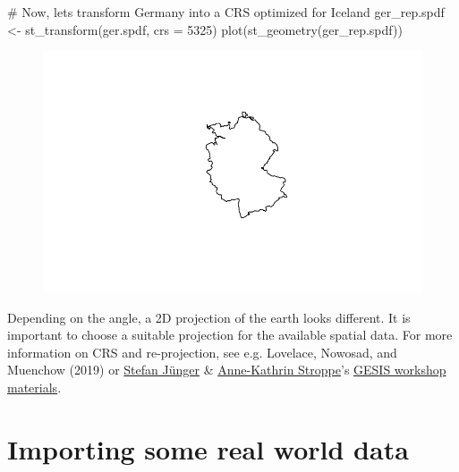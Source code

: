 \documentclass[
  letterpaper,
  DIV=11,
  numbers=noendperiod]{scrreprt}
\newenvironment{Shaded}{\begin{snugshade}}{\end{snugshade}}
\newcommand{\AttributeTok}[1]{\textcolor[rgb]{0.40,0.45,0.13}{#1}}
\newcommand{\CommentTok}[1]{\textcolor[rgb]{0.37,0.37,0.37}{#1}}
\newcommand{\DecValTok}[1]{\textcolor[rgb]{0.68,0.00,0.00}{#1}}
\newcommand{\FunctionTok}[1]{\textcolor[rgb]{0.28,0.35,0.67}{#1}}
\newcommand{\NormalTok}[1]{\textcolor[rgb]{0.00,0.23,0.31}{#1}}
\newcommand{\OtherTok}[1]{\textcolor[rgb]{0.00,0.23,0.31}{#1}}
\begin{document}
\begin{Shaded}
\begin{Highlighting}[]
\CommentTok{\# Now, let\textquotesingle{}s transform Germany into a CRS optimized for Iceland}
\NormalTok{ger\_rep.spdf }\OtherTok{\textless{}{-}} \FunctionTok{st\_transform}\NormalTok{(ger.spdf, }\AttributeTok{crs =} \DecValTok{5325}\NormalTok{)}
\FunctionTok{plot}\NormalTok{(}\FunctionTok{st\_geometry}\NormalTok{(ger\_rep.spdf))}
\end{Highlighting}
\end{Shaded}

\begin{figure}[H]

{\centering \includegraphics{01_refresher_files/figure-pdf/unnamed-chunk-5-2.pdf}

}

\end{figure}

Depending on the angle, a 2D projection of the earth looks different. It
is important to choose a suitable projection for the available spatial
data. For more information on CRS and re-projection, see e.g. Lovelace,
Nowosad, and Muenchow (2019) or
\href{https://stefanjuenger.github.io/}{Stefan Jünger} \&
\href{https://www.gesis.org/institut/mitarbeitendenverzeichnis/person/Anne-Kathrin.Stroppe}{Anne-Kathrin
Stroppe}'s
\href{https://github.com/StefanJuenger/gesis-workshop-geospatial-techniques-R-2023}{GESIS
workshop materials}.

\hypertarget{importing-some-real-world-data}{%
\section{Importing some real world
data}\label{importing-some-real-world-data}}
\end{document}
